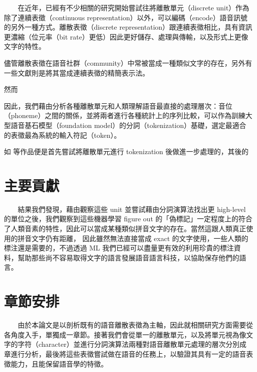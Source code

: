 　　在近年，已經有不少相關的研究開始嘗試往將離散單元（discrete unit）作為除了連續表徵（continuous representation）以外，可以編碼（encode）語音訊號的另外一種方式。離散表徵（discrete representation）跟連續表徵相比，具有資訊更濃縮（位元率（bit rate）更低）因此更好儲存、處理與傳輸，以及形式上更像文字的特性。

    儘管離散表徵在語音社群（community）中常被當成一種類似文字的存在，另外有一些文獻則是將其當成連續表徵的精簡表示法。

    然而

    因此，我們藉由分析各種離散單元和人類理解語音最直接的處理層次：音位（phoneme）之間的關係，並將兩者進行各種統計上的序列比較，可以作為訓練大型語音基石模型（foundation model）的分詞（tokenization）基礎，選定最適合的表徵最為系統的輸入符記（token）。

    如 \cite{wu2023wav2seq} 等作品便是首先嘗試將離散單元進行 tokenization 後做進一步處理的，其後的


\section{主要貢獻}  %

　　結果我們發現，藉由觀察這些 unit 並嘗試藉由分詞演算法找出更 high-level 的單位之後，我們觀察到這些機器學習 figure out 的「偽標記」一定程度上的符合了人類音素的特性，因此可以當成某種類似拼音文字的存在。當然這跟人類真正使用的拼音文字仍有距離，
因此雖然無法直接當成 exact 的文字使用，一些人類的標注還是需要的，不過透過 ML 我們已經可以盡量更有效的利用珍貴的標注資料，幫助那些尚不容易取得文字的語言發展語音語言科技，以協助保存他們的語言。


\section{章節安排}

　　由於本論文是以剖析既有的語音離散表徵為主軸，因此就相關研究方面需要從各角度入手，單獨成一章節。接著我們會從單一的離散單元，以及將單元視為像文字的字符（character）並進行分詞演算法兩種對語音離散單元處理的層次分別成章進行分析，最後將這些表徵嘗試做在語音的任務上，以驗證其具有一定的語音表徵能力，且能保留語音學的特徵。




